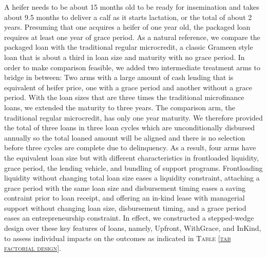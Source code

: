 	A heifer needs to be about 15 months old to be ready for insemination and takes about 9.5 months to deliver a calf as it starts lactation, or the total of about 2 years. Presuming that one acquires a heifer of one year old, the packaged loan requires at least one year of grace period. As a natural reference, we compare the packaged loan with the traditional regular microcredit, a classic Grameen style loan that is about a third in loan size and maturity with no grace period. In order to make comparison feasible, we added two intermediate treatment arms to bridge in between: Two arms with a large amount of cash lending that is equivalent of heifer price, one with a grace period and another without a grace period. With the loan sizes that are three times the traditional microfinance loans, we extended the maturity to three years. The comparison arm, the traditional regular microcredit, has only one year maturity. We therefore provided the total of three loans in three loan cycles which are unconditionally disbursed annually so the total loaned amount will be aligned and there is no selection before three cycles are complete due to delinquency. As a result, four arms have the equivalent loan size but with different characteristics in frontloaded liquidity, grace period, the lending vehicle, and bundling of support programs. Frontloading liquidity without changing total loan size eases a liquidity constraint, attaching a grace period with the same loan size and disbursement timing eases a saving contraint prior to loan receipt, and offering an in-kind lease with managerial support without changing loan size, disbursement timing, and a grace period eases an entrepreneurship constraint. In effect, we constructed a stepped-wedge design over these key features of loans, namely, \textsf{Upfront}, \textsf{WithGrace}, and \textsf{InKind}, to assess individual impacts on the outcomes as indicated in \textsc{\normalsize Table \ref{tab factorial design}}.

